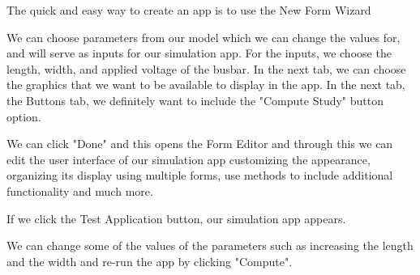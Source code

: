 The quick and easy way to create an app is to use the New Form Wizard


We can choose parameters from our model which we can change the values for, and will serve as inputs for our simulation app. For the inputs, we choose the length, width, and applied voltage of the busbar. In the next tab, we can choose the graphics that we want to be available to display in the app. In the next tab, the Buttons tab, we definitely want to include the "Compute Study" button option.

We can click "Done" and this opens the Form Editor and through this we can edit the user interface of our simulation app customizing the appearance, organizing its display using multiple forms, use methods to include additional functionality and much more.


If we click the Test Application button, our simulation app appears.


We can change some of the values of the parameters such as increasing the length and the width and re-run the app by clicking "Compute".